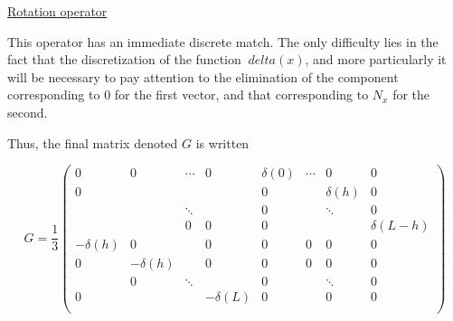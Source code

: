 \documentclass[a4paper]{article}
\begin{document}
\vspace{0.5cm}
\underline{Rotation operator}

This operator has an immediate discrete match. 
The only difficulty lies in the fact that the discretization of the function $ \ delta (x) $, 
and more particularly it will be necessary to pay attention to the elimination of the component corresponding to $ 0 $ for the first vector, 
and that corresponding to $ N_x $ for the second.

Thus, the final matrix denoted $ G $ is written

\[
G = \frac{1}{3}
\left(
\begin{array}{cccc|cccc}
	0 & 0 & \cdots & 0   &    \delta(0) & \cdots & 0      & 0 \\
	0 &   &        &     &    0 &  & \delta(h)      & 0\\
	  &   & \ddots &     &    0 &        &   \ddots & 0\\
	  &   &  0     & 0   &    0 &        &         & \delta(L-h)\\ 
	\hline
  - \delta(h) & 0          &        & 0            &   0  &  0     &  0     & 0\\
	       0  & -\delta(h) &        & 0            &   0  &  0     &  0     & 0\\
	          & 0          & \ddots &              &   0  &        & \ddots & 0\\
	      0   &            &        & -\delta(L)   &   0  &        &  0     & 0\\
\end{array}
\right)
\]




\end{document}
